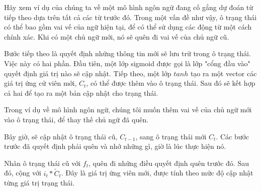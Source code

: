Hãy xem ví dụ của chúng ta về một mô hình ngôn ngữ đang cố gắng dự đoán từ tiếp theo dựa trên tất cả các từ trước đó.
Trong một vấn đề như vậy, ô trạng thái có thể bao gồm vai vế của ngữ hiện tại, để có thể sử dụng các động từ
một cách chính xác. Khi có một chủ ngữ mới, nó sẽ quên đi vai vế của chủ ngữ cũ.

\begin{figure}[H]
\end{figure}

Bước tiếp theo là quyết định những thông tin mới sẽ lưu trữ trong ô trạng thái. Việc này có hai phần. Đầu tiên,
một lớp sigmoid được gọi là lớp "cổng đầu vào" quyết định giá trị nào sẽ cập nhật. Tiếp theo, một lớp \(tanh\)
tạo ra một vector các giá trị ứng cử viên mới, \(C_t\), có thể được thêm vào ô trạng thái. Sau đó sẽ kết hợp  cả hai
để tạo ra một bản cập nhật cho trạng thái.

Trong ví dụ về mô hình ngôn ngữ, chúng tôi muốn thêm vai vế của chủ ngữ mới vào ô trạng thái, để thay thế chủ ngữ đã
quên.
\begin{figure}[H]
\end{figure}

Bây giờ, sẽ cập nhật ô trạng thái cũ, \(C_{t-1}\), sang ô trạng thái mới \(C_{t}\). Các bước trước đã quyết định phải
quên và nhớ những gì, giờ là lúc thực hiện nó.

Nhân ô trạng thái cũ với \(f_t\), quên đi những điều quyết định quên trước đó. Sau đó, cộng với \(i_t*\widetilde{C}_t\).
Đây là giá trị ứng viên mới, được tính theo mức độ cập nhật từng giá trị trạng thái.


